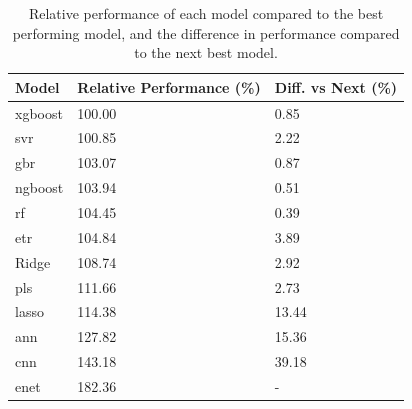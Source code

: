 \begin{table}[ht]
\centering
\begin{tabularx}{\linewidth}{lll}
\toprule
Model & Relative Performance (\%) & Diff. vs Next (\%) \\
\midrule
\gls{xgboost} & 100.00 & 0.85 \\
\gls{svr} & 100.85 & 2.22 \\
\gls{gbr} & 103.07 & 0.87 \\
\gls{ngboost} & 103.94 & 0.51 \\
\gls{rf} & 104.45 & 0.39 \\
\gls{etr} & 104.84 & 3.89 \\
Ridge & 108.74 & 2.92 \\
\gls{pls} & 111.66 & 2.73 \\
\gls{lasso} & 114.38 & 13.44 \\
\gls{ann} & 127.82 & 15.36 \\
\gls{cnn} & 143.18 & 39.18 \\
\gls{enet} & 182.36 & - \\
\bottomrule
\end{tabularx}
\caption{Relative performance of each model compared to the best performing model, and the difference in performance compared to the next best model.}
\label{tab:relative_performance}
\end{table}

